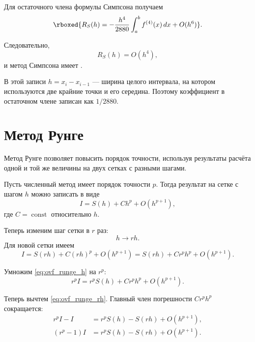\documentclass[../final.tex]{subfiles}
\begin{document}
Для остаточного члена формулы Симпсона получаем
%
\begin{equation*}
    \rboxed{
    R_S(h)
    =
    -\frac{h^4}{2880}
    \int_a^b f^{(4)}(x)\,dx
    +O(h^6)
    }.
\end{equation*}

Следовательно,
%
\begin{equation*}
    R_S(h)=O(h^4),
\end{equation*}
%
и метод Симпсона имеет .

\remark
В этой записи $h=x_i-x_{i-1}$ --- ширина целого интервала, на котором
используются две крайние точки и его середина. Поэтому коэффициент в
остаточном члене записан как $1/2880$.


\section{Метод Рунге}

Метод Рунге позволяет повысить порядок точности, используя результаты
расчёта одной и той же величины на двух сетках с разными шагами.

Пусть численный метод имеет порядок точности $p$. Тогда результат на
сетке с шагом $h$ можно записать в виде
%
\begin{equation}
    I
    =
    S(h)
    +C h^p
    +O(h^{p+1}),
    \label{eq:ovf_runge_h}
\end{equation}
%
где $C=\operatorname{const}$ относительно $h$.

Теперь изменим шаг сетки в $r$ раз:
%
\begin{equation*}
    h\longrightarrow rh.
\end{equation*}
%
Для новой сетки имеем
%
\begin{equation}
    I
    =
    S(rh)
    +C(rh)^p
    +O(h^{p+1})
    =
    S(rh)
    +Cr^ph^p
    +O(h^{p+1}).
    \label{eq:ovf_runge_rh}
\end{equation}

Умножим \eqref{eq:ovf_runge_h} на $r^p$:
%
\begin{equation*}
    r^pI
    =
    r^pS(h)
    +Cr^ph^p
    +O(h^{p+1}).
\end{equation*}

Теперь вычтем \eqref{eq:ovf_runge_rh}. Главный член погрешности
$Cr^ph^p$ сокращается:
%
\begin{align*}
    r^pI-I
    &=
    r^pS(h)-S(rh)
    +O(h^{p+1}),\\
    (r^p-1)I
    &=
    r^pS(h)-S(rh)
    +O(h^{p+1}).
\end{align*}
\end{document}

